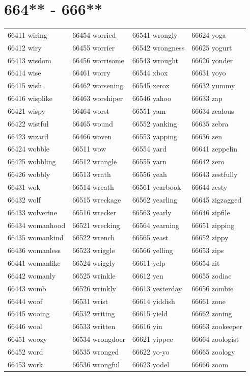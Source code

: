 \documentclass[10pt, oneside]{book}
\begin{document}
\begin{table}
	\centering
	\section*{664** - 666**}
	\begin{tabular}{l l l l}
66411 wiring &66454 worried &66541 wrongly &66624 yoga\\
66412 wiry &66455 worrier &66542 wrongness &66625 yogurt\\
66413 wisdom &66456 worrisome &66543 wrought &66626 yonder\\
66414 wise &66461 worry &66544 xbox &66631 yoyo\\
66415 wish &66462 worsening &66545 xerox &66632 yummy\\
66416 wisplike &66463 worshiper &66546 yahoo &66633 zap\\
66421 wispy &66464 worst &66551 yam &66634 zealous\\
66422 wistful &66465 wound &66552 yanking &66635 zebra\\
66423 wizard &66466 woven &66553 yapping &66636 zen\\
66424 wobble &66511 wow &66554 yard &66641 zeppelin\\
66425 wobbling &66512 wrangle &66555 yarn &66642 zero\\
66426 wobbly &66513 wrath &66556 yeah &66643 zestfully\\
66431 wok &66514 wreath &66561 yearbook &66644 zesty\\
66432 wolf &66515 wreckage &66562 yearling &66645 zigzagged\\
66433 wolverine &66516 wrecker &66563 yearly &66646 zipfile\\
66434 womanhood &66521 wrecking &66564 yearning &66651 zipping\\
66435 womankind &66522 wrench &66565 yeast &66652 zippy\\
66436 womanless &66523 wriggle &66566 yelling &66653 zips\\
66441 womanlike &66524 wriggly &66611 yelp &66654 zit\\
66442 womanly &66525 wrinkle &66612 yen &66655 zodiac\\
66443 womb &66526 wrinkly &66613 yesterday &66656 zombie\\
66444 woof &66531 wrist &66614 yiddish &66661 zone\\
66445 wooing &66532 writing &66615 yield &66662 zoning\\
66446 wool &66533 written &66616 yin &66663 zookeeper\\
66451 woozy &66534 wrongdoer &66621 yippee &66664 zoologist\\
66452 word &66535 wronged &66622 yo-yo &66665 zoology\\
66453 work &66536 wrongful &66623 yodel &66666 zoom\\
	\end{tabular}
 \end{table}
\clearpage
\end{document}
